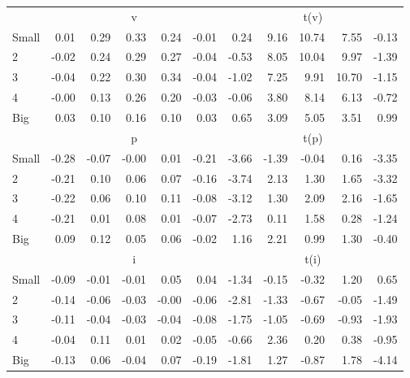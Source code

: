 \begin{table}[H]
\begin{tabular}{lrrrrrrrrrr}
  
     & \multicolumn{5}{c}{v} & \multicolumn{5}{c}{t(v)}   \\
     \cmidrule(r){2-6} \cmidrule(r){7-11} 
    Small  & 0.01  & 0.29  & 0.33  & 0.24  & -0.01  & 0.24  & 9.16  & 10.74  & 7.55  & -0.13   \\
    2  & -0.02  & 0.24  & 0.29  & 0.27  & -0.04  & -0.53  & 8.05  & 10.04  & 9.97  & -1.39   \\
    3  & -0.04  & 0.22  & 0.30  & 0.34  & -0.04  & -1.02  & 7.25  & 9.91  & 10.70  & -1.15   \\
    4  & -0.00  & 0.13  & 0.26  & 0.20  & -0.03  & -0.06  & 3.80  & 8.14  & 6.13  & -0.72   \\
    Big  & 0.03  & 0.10  & 0.16  & 0.10  & 0.03  & 0.65  & 3.09  & 5.05  & 3.51  & 0.99   \\
    
  
     & \multicolumn{5}{c}{p} & \multicolumn{5}{c}{t(p)}   \\
     \cmidrule(r){2-6} \cmidrule(r){7-11} 
    Small  & -0.28  & -0.07  & -0.00  & 0.01  & -0.21  & -3.66  & -1.39  & -0.04  & 0.16  & -3.35   \\
    2  & -0.21  & 0.10  & 0.06  & 0.07  & -0.16  & -3.74  & 2.13  & 1.30  & 1.65  & -3.32   \\
    3  & -0.22  & 0.06  & 0.10  & 0.11  & -0.08  & -3.12  & 1.30  & 2.09  & 2.16  & -1.65   \\
    4  & -0.21  & 0.01  & 0.08  & 0.01  & -0.07  & -2.73  & 0.11  & 1.58  & 0.28  & -1.24   \\
    Big  & 0.09  & 0.12  & 0.05  & 0.06  & -0.02  & 1.16  & 2.21  & 0.99  & 1.30  & -0.40   \\
    
  
     & \multicolumn{5}{c}{i} & \multicolumn{5}{c}{t(i)}   \\
     \cmidrule(r){2-6} \cmidrule(r){7-11} 
    Small  & -0.09  & -0.01  & -0.01  & 0.05  & 0.04  & -1.34  & -0.15  & -0.32  & 1.20  & 0.65   \\
    2  & -0.14  & -0.06  & -0.03  & -0.00  & -0.06  & -2.81  & -1.33  & -0.67  & -0.05  & -1.49   \\
    3  & -0.11  & -0.04  & -0.03  & -0.04  & -0.08  & -1.75  & -1.05  & -0.69  & -0.93  & -1.93   \\
    4  & -0.04  & 0.11  & 0.01  & 0.02  & -0.05  & -0.66  & 2.36  & 0.20  & 0.38  & -0.95   \\
    Big  & -0.13  & 0.06  & -0.04  & 0.07  & -0.19  & -1.81  & 1.27  & -0.87  & 1.78  & -4.14   \\
    

\end{tabular}
\end{table}
